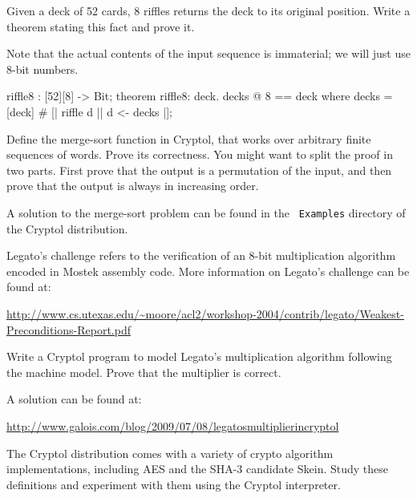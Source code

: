 \begin{Exercise}\label{ex:misc:riffle2}
  Given a deck of 52 cards, 8 riffles returns the deck to its original
  position. Write a theorem stating this fact and prove it.
\end{Exercise}
\begin{Answer}
  Note that the actual contents of the input sequence is immaterial;
  we will just use 8-bit numbers.
\begin{code}
   riffle8 : [52][8] -> Bit;
   theorem riffle8: {deck}. decks @ 8 == deck
     where decks = [deck] # [| riffle d || d <- decks |];
\end{code}
\end{Answer}

\begin{Exercise}\label{ex:misc:sort}
  Define the merge-sort function in Cryptol, that works over arbitrary
  finite sequences of words. Prove its correctness. You might want to
  split the proof in two parts. First prove that the output is a
  permutation of the input, and then prove that the output is always
  in increasing order.
\end{Exercise}
\begin{Answer}
  A solution to the merge-sort problem can be found in the {\tt
    Examples} directory of the Cryptol distribution.
\end{Answer}

\begin{Exercise}\label{ex:misc:legato}
  Legato's challenge refers to the verification of an 8-bit
  multiplication algorithm encoded in Mostek assembly code. More
  information on Legato's challenge can be found at:
\begin{center}
 \url{http://www.cs.utexas.edu/~moore/acl2/workshop-2004/contrib/legato/Weakest-Preconditions-Report.pdf}
\end{center}
Write a Cryptol program to model Legato's multiplication algorithm
following the machine model. Prove that the multiplier is correct.
\end{Exercise}
\begin{Answer}
A solution can be found at:
\begin{center} \url{http://www.galois.com/blog/2009/07/08/legatosmultiplierincryptol}
\end{center}
\end{Answer}

\begin{Exercise}\label{ex:misc:skein}
  The Cryptol distribution comes with a variety of crypto algorithm
  implementations, including AES and the SHA-3 candidate Skein.  Study
  these definitions and experiment with them using the Cryptol
  interpreter.
\end{Exercise}
